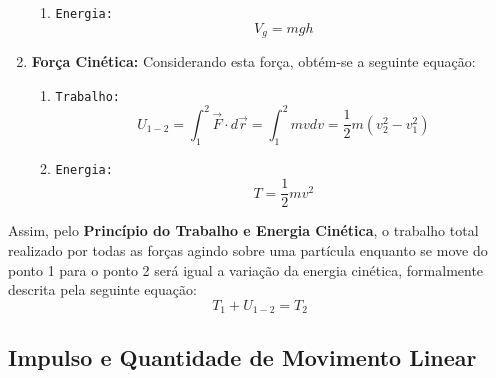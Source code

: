 \documentclass{article}
\begin{document}
\begin{enumerate}[noitemsep]
\begin{enumerate}[noitemsep]
                            \item \texttt{Energia:}
                                \begin{equation}
                                    \boxed{
                                        V_{g} = mgh
                                    }
                                \end{equation}
                        \end{enumerate}
                    \item \textbf{Força Cinética:} Considerando esta força, obtém-se a seguinte equação:
                        \begin{enumerate}[noitemsep]
                            \item \texttt{Trabalho:}
                                \[
                                    \boxed{
                                        U_{1-2} = \int_{1}^{2} \vec{F} \cdot d\vec{r}
                                                = \int_{1}^{2} mvdv
                                                = \frac{1}{2} m (v_{2}^{2} - v_{1}^{2})
                                    }
                                \]
                            \item \texttt{Energia:}
                                \begin{equation}
                                    \boxed{
                                        T = \frac{1}{2} m v^{2}
                                    }
                                \end{equation}
                        \end{enumerate}
                \end{enumerate}
            Assim, pelo \textbf{Princípio do Trabalho e Energia Cinética}, o trabalho total realizado por todas as forças agindo sobre uma partícula enquanto se move do ponto 1 para o ponto 2 será igual a variação da energia cinética, formalmente descrita pela seguinte equação:
                \begin{equation}
                    \boxed{
                        T_{1} + U_{1-2} = T_{2}
                    }
                \end{equation}

        \subsection{Impulso e Quantidade de Movimento Linear}
\end{document}
